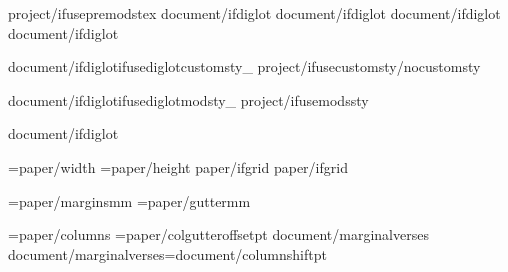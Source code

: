 \def\pluginlist{{{project/plugins}}}



{project/ifusepremodstex}
{document/ifdiglot}\diglottrue
{document/ifdiglot}\diglotcolumns
{document/ifdiglot}
{document/ifdiglot}


{document/ifdiglot}{ifusediglotcustomsty_}
{project/ifusecustomsty}{/nocustomsty}

{document/ifdiglot}{ifusediglotmodsty_} %
{project/ifusemodssty} %

{document/ifdiglot}

\PaperWidth={paper/width}
\PaperHeight={paper/height}
{paper/ifgrid}
{paper/ifgrid}\def\doLines{{{grid/gridgraph}{grid/gridlines}}}

\MarginUnit={paper/margins}mm
\def\TopMarginFactor{{{paper/topmarginfactor}}}
\def\BottomMarginFactor{{{paper/bottommarginfactor}}}
\def\SideMarginFactor{{1.0}}
\BindingGutter={paper/gutter}mm
\def\DefaultSpaceBeside{{{document/cutouterpadding} pt}}

\BodyColumns={paper/columns}\def\mainBodyColumns{{{paper/columns}}}
\def\ColumnGutterFactor{{{document/colgutterfactor}}}
\ColumnGutterRuleSkip={paper/colgutteroffset}pt
\def\StudyGutterFactor{{{studynotes/colgutterfactor}}}
{document/marginalverses}
{document/marginalverses}\columnshift={document/columnshift}pt
\def\PageFullFactor{{{document/pagefullfactor}}}
\def\BalanceThreshold{{{paper/bottomrag}}}

